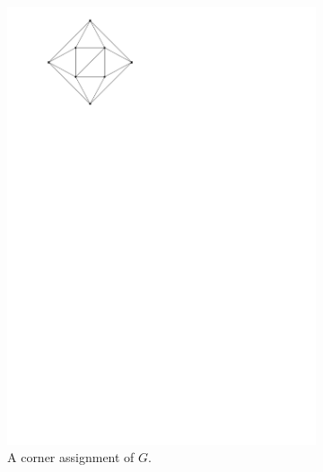 \begin{figure}
\begin{subfigure}[t]{3cm}
        \includegraphics[scale=.3]{introduction/img/caCa.pdf}
        \caption{A corner assignment of $G$.}
      \end{subfigure}~
      \begin{subfigure}[t]{3cm}
        \centering

\end{subfigure}
\end{figure}
